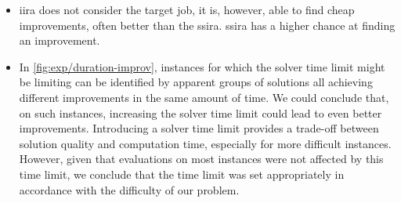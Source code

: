 \begin{itemize}
    \item \ac{iira} does not consider the target job, it is, however, able to find cheap improvements,
        often better than the \ac{ssira}. \ac{ssira} has a higher chance at finding an improvement.

    \item 
    In \cref{fig:exp/duration-improv}, instances for which the solver time limit might be limiting
    can be identified by apparent groups of solutions all achieving different improvements
    in the same amount of time.
    We could conclude that, on such instances,
    increasing the solver time limit could lead to even better improvements.
    Introducing a solver time limit provides a trade-off between solution quality and computation time,
    especially for more difficult instances.
    However, given that evaluations on most instances were not affected by this time limit,
    we conclude that the time limit was set appropriately in accordance with the difficulty of our problem.
\end{itemize}
